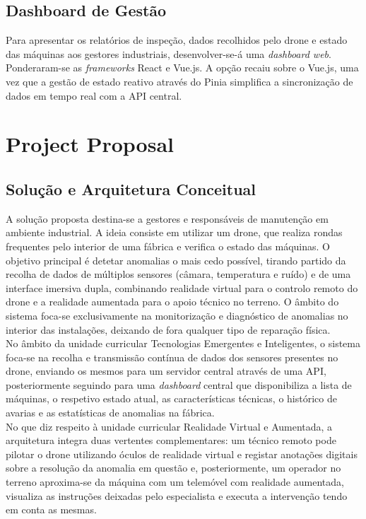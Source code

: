 \documentclass[conference,a4paper]{IEEEtran}
\begin{document}
\subsection{Dashboard de Gestão}
Para apresentar os relatórios de inspeção, dados recolhidos pelo drone e estado das máquinas aos gestores industriais, desenvolver-se-á uma \textit{dashboard web}. Ponderaram-se as \textit{frameworks} React e Vue.js. A opção recaiu sobre o Vue.js, uma vez que a gestão de estado reativo através do Pinia simplifica a sincronização de dados em tempo real com a API central.

\section{Project Proposal}
\subsection{Solução e Arquitetura Conceitual}
A solução proposta destina-se a gestores e responsáveis de manutenção em ambiente industrial. A ideia consiste em utilizar um drone, que realiza rondas frequentes pelo interior de uma fábrica e verifica o estado das máquinas. O objetivo principal é detetar anomalias o mais cedo possível, tirando partido da recolha de dados de múltiplos sensores (câmara, temperatura e ruído) e de uma interface imersiva dupla, combinando realidade virtual para o controlo remoto do drone e a realidade aumentada para o apoio técnico no terreno. O âmbito do sistema foca-se exclusivamente na monitorização e diagnóstico de anomalias no interior das instalações, deixando de fora qualquer tipo de reparação física. \\

No âmbito da unidade curricular Tecnologias Emergentes e Inteligentes, o sistema foca-se na recolha e transmissão contínua de dados dos sensores presentes no drone, enviando os mesmos para um servidor central através de uma API, posteriormente seguindo para uma \textit{dashboard} central que disponibiliza a lista de máquinas, o respetivo estado atual, as características técnicas, o histórico de avarias e as estatísticas de anomalias na fábrica. \\

No que diz respeito à unidade curricular Realidade Virtual e Aumentada, a arquitetura integra duas vertentes complementares: um técnico remoto pode pilotar o drone utilizando óculos de realidade virtual e registar anotações digitais sobre a resolução da anomalia em questão e, posteriormente, um operador no terreno aproxima-se da máquina com um telemóvel com realidade aumentada, visualiza as instruções deixadas pelo especialista e executa a intervenção tendo em conta as mesmas. \\
\end{document}
